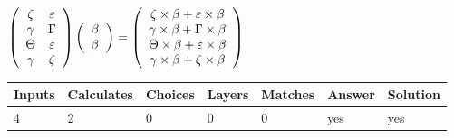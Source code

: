 \documentclass[12pt]{article}
\begin{document}
$  %
 \left( \begin{array}
 {
 c
 c
 }
                    \zeta & 
 \varepsilon \\ 
 \gamma & 
 \Gamma \\ 
 \Theta & 
 \varepsilon \\ 
 \gamma & 
                    \zeta
 \end{array} \right)
 \left( \begin{array}
 {
 c
 }
 \beta \\ 
 \beta
 \end{array} \right)
=
  \left( \begin{array}
 {
 c
 }
                    \zeta \times  \beta   +  \varepsilon \times  \beta \\ 
 \gamma \times  \beta   +  \Gamma \times  \beta \\ 
 \Theta \times  \beta   +  \varepsilon \times  \beta \\ 
 \gamma \times  \beta   +                     \zeta \times  \beta
 \end{array} \right)
$
 
 
 
\noindent{}
 
 

 
 
 
\noindent{}
 
 

 
 
\noindent{}
 
 

 
\vspace{0.3in}
   
   
   
   
\noindent\begin{tabular}{|l|l|l|l|l|l|l|}
 \hline
Inputs & Calculates & Choices & Layers & Matches & Answer & Solution \\ \hline
           4 & 
           2 & 
           0
  & 
           0 & 
           0 & 
  yes & 
  yes 
  \\ \hline
 \end{tabular}
   
   
   
   
\noindent{}
   
\end{document}
